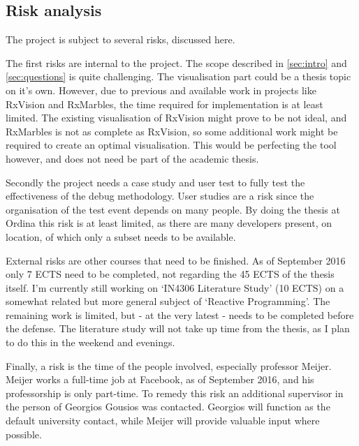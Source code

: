 \documentclass[11pt,a4paper]{article}
\begin{document}
\subsection{Risk analysis} The project is subject to several risks,
discussed here.

The first risks are internal to the project.  The scope described in
\autoref{sec:intro} and~%
\ref{sec:questions} is quite challenging.  The visualisation part could
be a thesis topic on it's own.  However, due to previous and available
work in projects like RxVision and RxMarbles, the time required for
implementation is at least limited.  The existing visualisation of
RxVision might prove to be not ideal, and RxMarbles is not as complete
as RxVision, so some additional work might be required to create an
optimal visualisation.  This would be perfecting the tool however, and
does not need be part of the academic thesis.

Secondly the project needs a case study and user test to fully test the
effectiveness of the debug methodology.  User studies are a risk since
the organisation of the test event depends on many people.  By doing the
thesis at Ordina this risk is at least limited, as there are many
developers present, on location, of which only a subset needs to be
available.

External risks are other courses that need to be finished.  As of
September 2016 only 7 ECTS need to be completed, not regarding the 45
ECTS of the thesis itself.  I'm currently still working on `IN4306
Literature Study' (10 ECTS) on a somewhat related but more general
subject of `Reactive Programming'.  The remaining work is limited, but -
at the very latest - needs to be completed before the defense.  The
literature study will not take up time from the thesis, as I plan to do
this in the weekend and evenings.

Finally, a risk is the time of the people involved, especially professor
Meijer.  Meijer works a full-time job at Facebook, as of September 2016,
and his professorship is only part-time.  To remedy this risk an
additional supervisor in the person of Georgios Gousios was contacted.
Georgios will function as the default university contact, while Meijer
will provide valuable input where possible.


{}


%
%
%
%
%
%
\end{document}
